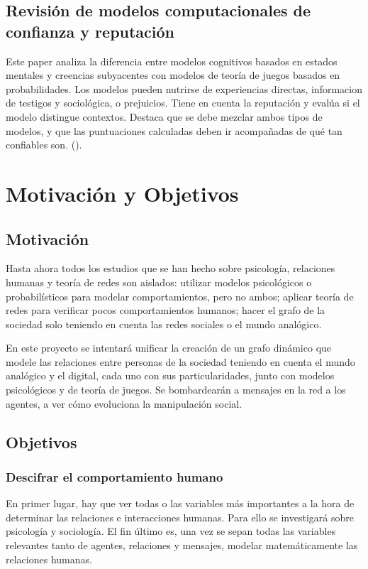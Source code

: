 \documentclass[12pt]{extarticle}
\numberwithin{equation}{section}
\begin{document}
\subsection{Revisión de modelos computacionales de confianza y reputación}
Este paper analiza la diferencia entre modelos cognitivos basados en estados mentales y creencias subyacentes con modelos de teoría de juegos basados en probabilidades. Los modelos pueden nutrirse de experiencias directas, informacion de testigos y sociológica, o prejuicios. Tiene en cuenta la reputación y evalúa si el modelo distingue contextos. Destaca que se debe mezclar ambos tipos de modelos, y que las puntuaciones calculadas deben ir acompañadas de qué tan confiables son. (\cite{ReputationModels}).

\newpage

\section{Motivación y Objetivos}

\subsection{Motivación}
Hasta ahora todos los estudios que se han hecho sobre psicología, relaciones humanas y teoría de redes son aislados: utilizar modelos psicológicos o probabilísticos para modelar comportamientos, pero no ambos; aplicar teoría de redes para verificar pocos comportamientos humanos; hacer el grafo de la sociedad solo teniendo en cuenta las redes sociales o el mundo analógico.

En este proyecto se intentará unificar la creación de un grafo dinámico que modele las relaciones entre personas de la sociedad teniendo en cuenta el mundo analógico y el digital, cada uno con sus particularidades, junto con modelos psicológicos y de teoría de juegos. Se bombardearán a mensajes en la red a los agentes, a ver cómo evoluciona la manipulación social. 

\subsection{Objetivos}

\subsubsection{Descifrar el comportamiento humano}
En primer lugar, hay que ver todas o las variables más importantes a la hora de determinar las relaciones e interacciones humanas. Para ello se investigará sobre psicología y sociología. El fin último es, una vez se sepan todas las variables relevantes tanto de agentes, relaciones y mensajes, modelar matemáticamente las relaciones humanas.
\end{document}
